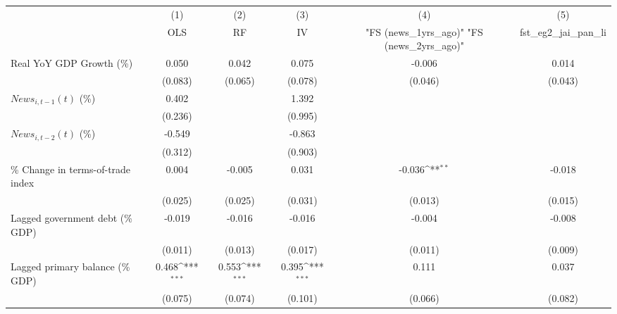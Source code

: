 {
\def\sym#1{\ifmmode^{#1}\else\(^{#1}\)\fi}
\begin{tabular}{l*{5}{c}}
\toprule
                    &\multicolumn{1}{c}{(1)}&\multicolumn{1}{c}{(2)}&\multicolumn{1}{c}{(3)}&\multicolumn{1}{c}{(4)}&\multicolumn{1}{c}{(5)}\\
                    &\multicolumn{1}{c}{OLS}&\multicolumn{1}{c}{RF}&\multicolumn{1}{c}{IV}&\multicolumn{1}{c}{ "FS (news_1yrs_ago)"  "FS (news_2yrs_ago)" }&\multicolumn{1}{c}{fst_eg2_jai_pan_li}\\
\midrule
Real YoY GDP Growth (\%)&       0.050         &       0.042         &       0.075         &      -0.006         &       0.014         \\
                    &     (0.083)         &     (0.065)         &     (0.078)         &     (0.046)         &     (0.043)         \\
\addlinespace
$ News_{i,t-1}(t)$ (\%)&       0.402         &                     &       1.392         &                     &                     \\
                    &     (0.236)         &                     &     (0.995)         &                     &                     \\
\addlinespace
$ News_{i,t-2}(t)$ (\%)&      -0.549         &                     &      -0.863         &                     &                     \\
                    &     (0.312)         &                     &     (0.903)         &                     &                     \\
\addlinespace
\% Change in terms-of-trade index&       0.004         &      -0.005         &       0.031         &      -0.036\sym{**} &      -0.018         \\
                    &     (0.025)         &     (0.025)         &     (0.031)         &     (0.013)         &     (0.015)         \\
\addlinespace
Lagged government debt (\% GDP)&      -0.019         &      -0.016         &      -0.016         &      -0.004         &      -0.008         \\
                    &     (0.011)         &     (0.013)         &     (0.017)         &     (0.011)         &     (0.009)         \\
\addlinespace
Lagged primary balance (\% GDP)&       0.468\sym{***}&       0.553\sym{***}&       0.395\sym{***}&       0.111         &       0.037         \\
                    &     (0.075)         &     (0.074)         &     (0.101)         &     (0.066)         &     (0.082)         \\

\end{tabular}}
